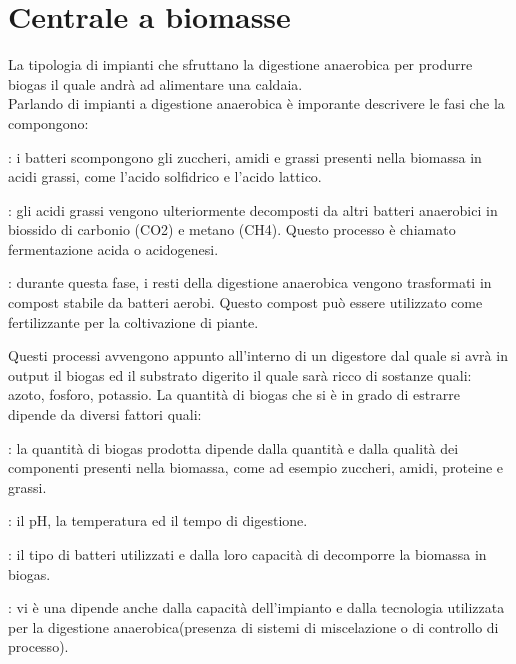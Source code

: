 \section{Centrale a biomasse}
La tipologia di impianti che sfruttano la digestione anaerobica per produrre biogas il quale andrà ad alimentare una caldaia.\\
Parlando di impianti a digestione anaerobica è imporante descrivere le fasi che la compongono:\\
\begin{description}[labelindent=5mm]
    \item[$\bullet$ Produzione di acidi grassi]: i batteri scompongono gli zuccheri, amidi e grassi presenti nella biomassa in acidi grassi, come l'acido solfidrico e l'acido lattico.
    \item[$\bullet$ Fermentazione]: gli acidi grassi vengono ulteriormente decomposti da altri batteri anaerobici in biossido di carbonio (CO2) e metano (CH4). Questo processo è chiamato fermentazione acida o acidogenesi.
    \item[$\bullet$ Maturazione]: durante questa fase, i resti della digestione anaerobica vengono trasformati in compost stabile da batteri aerobi. Questo compost può essere utilizzato come fertilizzante per la coltivazione di piante.
\end{description}
Questi processi avvengono appunto all'interno di un digestore dal quale si avrà in output il biogas ed il substrato digerito il quale sarà ricco di sostanze quali: azoto, fosforo, potassio.
La quantità di biogas che si è in grado di estrarre dipende da diversi fattori quali:
\begin{description}[labelindent=5mm]
    \item[$\bullet$ Composizione chimica della biomassa]: la quantità di biogas prodotta dipende dalla quantità e dalla qualità dei componenti presenti nella biomassa, come ad esempio zuccheri, amidi, proteine e grassi.
    \item[$\bullet$ Condizioni ambientali]: il pH, la temperatura ed il tempo di digestione.
    \item[$\bullet$ Tipo di batteri]: il tipo di batteri utilizzati e dalla loro capacità di decomporre la biomassa in biogas.
    \item[$\bullet$ Dimensione e tecnologia dell'impianto]: vi è una dipende anche dalla capacità dell'impianto e dalla tecnologia utilizzata per la digestione anaerobica(presenza di sistemi di miscelazione o di controllo di processo).
\end{description}
